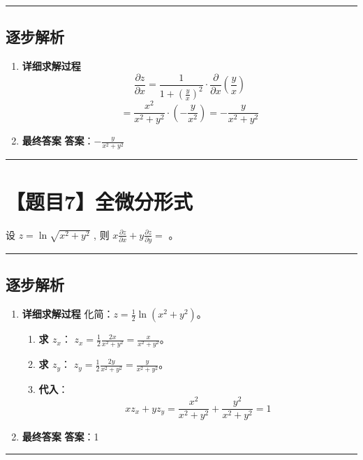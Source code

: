 \documentclass[UTF8]{ctexart}
\newenvironment{redenv}{\color{red}}{}
\newenvironment{detailedanalysis}{%
    \color{red}
    \begin{enumerate}[label=\textbf{第\arabic*步：}, leftmargin=*, align=left, itemsep=1.5ex]
}{%
    \end{enumerate}
}
\newcommand{\problemrule}{\noindent\rule{\textwidth}{1.5pt}\vspace{-0.8em}}
\newcommand{\analysisrule}{\noindent\rule{\textwidth}{0.8pt}\vspace{-0.8em}}
\newcommand{\blank}[1]{\underline{\hspace{#1}}}
\begin{document}
\begin{redenv}
\analysisrule
\subsection*{逐步解析}

\begin{detailedanalysis}
\item \textbf{详细求解过程}
$$ \frac{\partial z}{\partial x} = \frac{1}{1+(\frac{y}{x})^2} \cdot \frac{\partial}{\partial x}(\frac{y}{x}) $$
$$ = \frac{x^2}{x^2+y^2} \cdot (-\frac{y}{x^2}) = -\frac{y}{x^2+y^2} $$

\item \textbf{最终答案}
\textbf{答案}：$ -\frac{y}{x^2+y^2} $
\end{detailedanalysis}
\end{redenv}

\problemrule
\section*{【题目7】全微分形式}
设 $ z = \ln\sqrt{x^{2} + y^{2}} $ , 则 $ x\frac{\partial z}{\partial x} + y\frac{\partial z}{\partial y} = $ \blank{2cm}。

\begin{redenv}
\analysisrule
\subsection*{逐步解析}

\begin{detailedanalysis}
\item \textbf{详细求解过程}
化简：$z = \frac{1}{2} \ln(x^2+y^2)$。
\begin{enumerate}[label=(\arabic*)]
\item \textbf{求 $z_x$}：
$z_x = \frac{1}{2} \frac{2x}{x^2+y^2} = \frac{x}{x^2+y^2}$。
\item \textbf{求 $z_y$}：
$z_y = \frac{1}{2} \frac{2y}{x^2+y^2} = \frac{y}{x^2+y^2}$。
\item \textbf{代入}：
$$ x z_x + y z_y = \frac{x^2}{x^2+y^2} + \frac{y^2}{x^2+y^2} = 1 $$
\end{enumerate}

\item \textbf{最终答案}
\textbf{答案}：1
\end{detailedanalysis}
\end{redenv}

\problemrule
\end{document}
